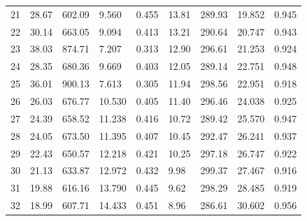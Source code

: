 \documentclass[12pt]{article}
\begin{document}
\begin{table}
\begin{tabular}{| l | l l l l | l l l l |}
21 & 28.67 & 602.09 & 9.560 & 0.455 & 13.81 & 289.93 & 19.852 & 0.945 \\
22 & 30.14 & 663.05 & 9.094 & 0.413 & 13.21 & 290.64 & 20.747 & 0.943 \\
23 & 38.03 & 874.71 & 7.207 & 0.313 & 12.90 & 296.61 & 21.253 & 0.924 \\
24 & 28.35 & 680.36 & 9.669 & 0.403 & 12.05 & 289.14 & 22.751 & 0.948 \\
25 & 36.01 & 900.13 & 7.613 & 0.305 & 11.94 & 298.56 & 22.951 & 0.918 \\
26 & 26.03 & 676.77 & 10.530 & 0.405 & 11.40 & 296.46 & 24.038 & 0.925 \\
27 & 24.39 & 658.52 & 11.238 & 0.416 & 10.72 & 289.42 & 25.570 & 0.947 \\
28 & 24.05 & 673.50 & 11.395 & 0.407 & 10.45 & 292.47 & 26.241 & 0.937 \\
29 & 22.43 & 650.57 & 12.218 & 0.421 & 10.25 & 297.18 & 26.747 & 0.922 \\
30 & 21.13 & 633.87 & 12.972 & 0.432 & 9.98 & 299.37 & 27.467 & 0.916 \\
31 & 19.88 & 616.16 & 13.790 & 0.445 & 9.62 & 298.29 & 28.485 & 0.919 \\
32 & 18.99 & 607.71 & 14.433 & 0.451 & 8.96 & 286.61 & 30.602 & 0.956 \\
	\hline
\end{tabular}
\end{table}
\end{document}
